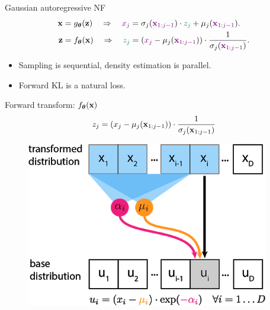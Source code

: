 \begin{frame}{Gaussian autoregressive NF}
	\vspace{-0.5cm}
	\begin{align*}
		\mathbf{x} &= g_{\boldsymbol{\theta}}(\mathbf{z}) \quad \Rightarrow \quad {\color{violet} x_j} = \sigma_j ({\color{violet} \mathbf{x}_{1:j-1}}) \cdot {\color{teal} z_j} + \mu_j({\color{violet} \mathbf{x}_{1:j-1}}). \\
		\mathbf{z} &= f_{\boldsymbol{\theta}}(\mathbf{x}) \quad \Rightarrow \quad {\color{teal} z_j} = \left({\color{violet}x_j} - \mu_j({\color{violet}\mathbf{x}_{1:j-1}}) \right) \cdot \frac{1}{ \sigma_j ({\color{violet}\mathbf{x}_{1:j-1}})}.
	\end{align*}
	
	\begin{itemize}
		\item Sampling is sequential, density estimation is parallel.
		\item Forward KL is a natural loss.
	\end{itemize}
	\vspace{-0.3cm}
	
	\begin{minipage}[t]{0.65\columnwidth}
		\begin{block}{Forward transform: $f_{\boldsymbol{\theta}}(\mathbf{x})$}
			\[
				z_j = (x_j - \mu_j(\mathbf{x}_{1:j-1})) \cdot \frac{1}{\sigma_j (\mathbf{x}_{1:j-1}) }
			\]
			\vspace{-0.4cm}
		\end{block}
	\end{minipage}%
	\begin{minipage}[t]{0.35\columnwidth}
		\begin{figure}[h]
			\centering
			\includegraphics[width=.9\linewidth]{figs/af_iaf_explained_2.png}
		\end{figure}
	\end{minipage} \\
	

\end{frame}
